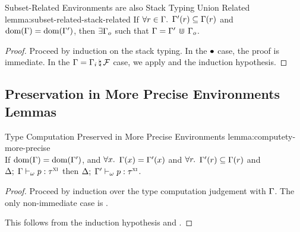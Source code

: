 \begin{oxlemma}{Subset-Related Environments are also Stack Typing Union Related}
  {lemma:subset-related-stack-related} If $\forall r \in \Gamma.$
  $\Gamma^\prime(r) \subseteq \Gamma(r)$ and
  $\textrm{dom}(\Gamma) = \textrm{dom}(\Gamma^\prime)$, then $\exists \Gamma_o$ such
  that $\Gamma = \Gamma^\prime \, \Cup \, \Gamma_o$.
\end{oxlemma}

\begin{proof}
  Proceed by induction on the stack typing. In the $\bullet$ case, the proof
  is immediate. In the $\Gamma = \Gamma_i \, \natural \, \mathcal{F}$ case, we
  apply  and the induction hypothesis.
\end{proof}

\subsection{Preservation in More Precise Environments Lemmas}
\label{sec:more-precise-lemmas}

\begin{oxlemma}{Type Computation Preserved in More Precise Environments}
  {lemma:computety-more-precise}\hfill\\ If $\textrm{dom}(\Gamma) =
  \textrm{dom}(\Gamma^\prime)$, and $\forall x.$ $\Gamma(x) = \Gamma^\prime(x)$ and $\forall r.$ $\Gamma^\prime(r)
  \subseteq \Gamma(r)$ and
  $ \Delta; \; \Gamma \vdash_{\omega} p : \tau^\textsc{xi} $
  then
  $ \Delta; \; \Gamma^\prime \vdash_{\omega} p : \tau^\textsc{xi} $.
\end{oxlemma}

\begin{proof}
  Proceed by induction over the type computation judgement with $\Gamma$. The
  only non-immediate case is .

  \vspace{1em}
  \noindent \framebox[\textwidth]{
    \figuresize
    \begin{mathpar}
      \TCDeref
    \end{mathpar}
  }
  \vspace{1em}

  This follows from the induction hypothesis and
  .

\end{proof}

